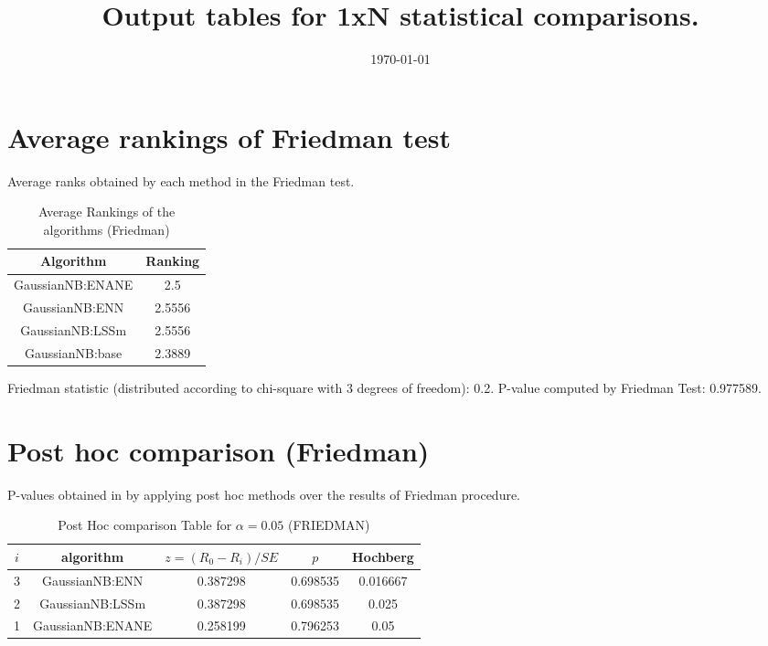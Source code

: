 \documentclass[a4paper,10pt]{article}
\title{Output tables for 1xN statistical comparisons.}
\author{}
\date{\today}
\begin{document}
\begin{landscape}
\pagestyle{empty}
\maketitle
\thispagestyle{empty}

\section{Average rankings of Friedman test}


Average ranks obtained by each method in the Friedman test.

\begin{table}[!htp]
\centering
\begin{tabular}{|c|c|}\hline
Algorithm&Ranking\\\hline
GaussianNB:ENANE&2.5\\GaussianNB:ENN&2.5556\\GaussianNB:LSSm&2.5556\\GaussianNB:base&2.3889\\\hline\end{tabular}
\caption{Average Rankings of the algorithms (Friedman)}
\end{table}

Friedman statistic (distributed according to chi-square with 3 degrees of freedom): 0.2. \newline P-value computed by Friedman Test: 0.977589.\newline


\newpage

\section{Post hoc comparison (Friedman)}


P-values obtained in by applying post hoc methods over the results of Friedman procedure.

\begin{table}[!htp]
\centering\footnotesize
\begin{tabular}{ccccc}
$i$&algorithm&$z=(R_0 - R_i)/SE$&$p$&Hochberg \\
\hline3&GaussianNB:ENN&0.387298&0.698535&0.016667\\2&GaussianNB:LSSm&0.387298&0.698535&0.025\\1&GaussianNB:ENANE&0.258199&0.796253&0.05\\\hline
\end{tabular}
\caption{Post Hoc comparison Table for $\alpha=0.05$ (FRIEDMAN)}
\end{table}
\newpage


\end{landscape}
\end{document}
